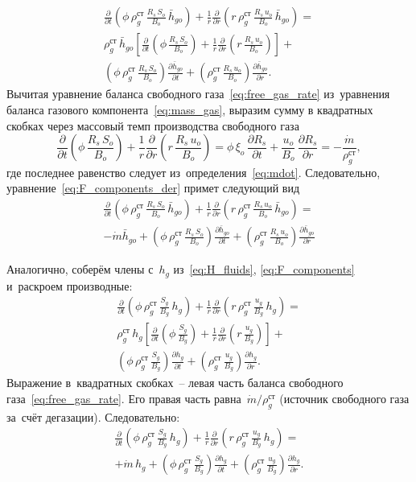 \documentclass[12pt,a4paper]{article}
\newcommand{\divr}[1]{\frac{1}{r}\frac{\partial}{\partial r}\!\left(r\,#1\right)}
\newcommand{\pdt}[1]{\frac{\partial #1}{\partial t}}
\newcommand{\pdr}[1]{\frac{\partial #1}{\partial r}}
\newcommand{\xio}{\xi_o}
\newcommand{\mdot}{\dot{m}}
\begin{document}
\begin{multline}\label{eq:F_components_der}
  \pdt{}\!\left(\phi\,\rho_g^{\text{ст}}\,
    \frac{R_s\,S_o}{B_o}\,\bar{h}_{go}\right)
  + \divr{\rho_g^{\text{ст}}\,
    \frac{R_s\,u_o}{B_o}\,\bar{h}_{go}} =
    \\
    \rho_g^{\text{ст}}\,\bar{h}_{go}\!\left[
    \pdt{}\!\left(\phi\,
      \frac{R_s\,S_o}{B_o}\right)
    + \divr{
      \frac{R_s\,u_o}{B_o}}
  \right]
  +
  \\
    \left(\phi\,\rho_g^{\text{ст}}\,
      \frac{R_s\,S_o}{B_o}\right)
    \pdt{\bar{h}_{go}}\!
    + \left(\rho_g^{\text{ст}}\,
      \frac{R_s\,u_o}{B_o}\right)\pdr{\bar{h}_{go} }.
\end{multline}
Вычитая уравнение баланса свободного
газа~\eqref{eq:free_gas_rate} из~уравнения баланса газового
компонента~\eqref{eq:mass_gas}, выразим сумму в квадратных скобках
через массовый темп производства свободного газа
\[
  \pdt{}\!\left(\phi\,\frac{R_s\,S_o}{B_o}\right)
  + \divr{\frac{R_s\,u_o}{B_o}}
  = \phi\,\xio\,\pdt{R_s}
    + \frac{u_o}{B_o}\,\pdr{R_s}
  = -\frac{\mdot}{\rho_g^{\text{ст}}},
\]
где последнее равенство следует из~определения~\eqref{eq:mdot}.
Следовательно, уравнение~\eqref{eq:F_components_der} примет следующий вид
\begin{multline}\label{eq:F_components_derived}
  \pdt{}\!\left(\phi\,\rho_g^{\text{ст}}\,
    \frac{R_s\,S_o}{B_o}\,\bar{h}_{go}\right)
  + \divr{\rho_g^{\text{ст}}\,
    \frac{R_s\,u_o}{B_o}\,\bar{h}_{go}} =
    \\
    -\mdot\bar{h}_{go}
  +
    \left(\phi\,\rho_g^{\text{ст}}\,
      \frac{R_s\,S_o}{B_o}\right)
    \pdt{\bar{h}_{go}}\!
    + \left(\rho_g^{\text{ст}}\,
      \frac{R_s\,u_o}{B_o}\right)\pdr{\bar{h}_{go} }
\end{multline}

Аналогично, соберём члены с~$h_g$ из~\eqref{eq:H_fluids},
\eqref{eq:F_components} и~раскроем производные:
\begin{multline}\label{eq:hg_components_der}
  \pdt{}\!\left(\phi\,\rho_g^{\text{ст}}\,
    \frac{S_g}{B_g}\,h_g\right)
  + \divr{\rho_g^{\text{ст}}\,
    \frac{u_g}{B_g}\,h_g} =
    \\
    \rho_g^{\text{ст}}\,h_g\!\left[
    \pdt{}\!\left(\phi\,
      \frac{S_g}{B_g}\right)
    + \divr{\frac{u_g}{B_g}}
  \right]
  +
  \\
    \left(\phi\,\rho_g^{\text{ст}}\,
      \frac{S_g}{B_g}\right)
    \pdt{h_g}\!
    + \left(\rho_g^{\text{ст}}\,
      \frac{u_g}{B_g}\right)\pdr{h_g}.
\end{multline}
Выражение в~квадратных скобках~-- левая часть баланса свободного
газа~\eqref{eq:free_gas_rate}. Его правая часть
равна~$\mdot/\rho_g^{\text{ст}}$ (источник свободного газа за~счёт
дегазации). Следовательно:
\begin{multline}\label{eq:hg_components_derived}
  \pdt{}\!\left(\phi\,\rho_g^{\text{ст}}\,
    \frac{S_g}{B_g}\,h_g\right)
  + \divr{\rho_g^{\text{ст}}\,
    \frac{u_g}{B_g}\,h_g} =
    \\
    +\mdot\,h_g
  +
    \left(\phi\,\rho_g^{\text{ст}}\,
      \frac{S_g}{B_g}\right)
    \pdt{h_g}\!
    + \left(\rho_g^{\text{ст}}\,
      \frac{u_g}{B_g}\right)\pdr{h_g}.
\end{multline}
\end{document}
